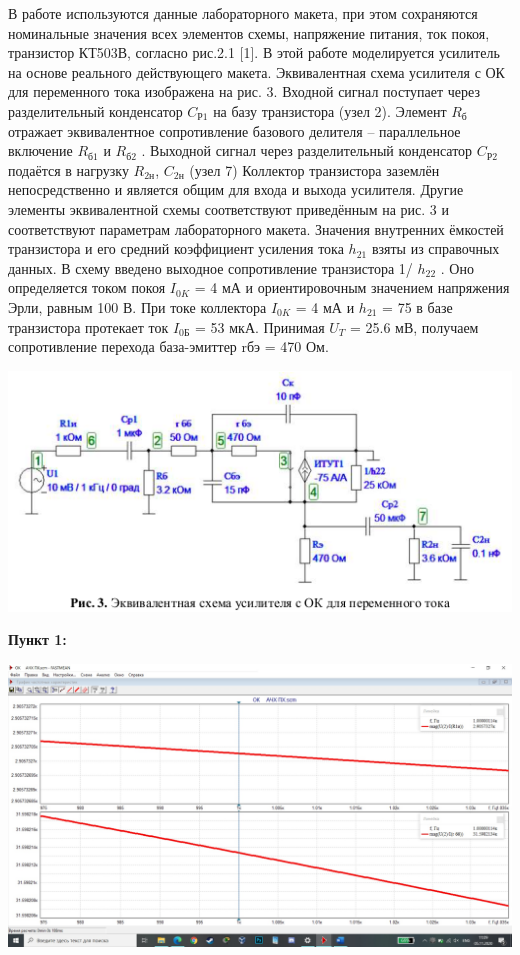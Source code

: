 \documentclass[a4paper,14pt]{extarticle}
\begin{document}
    В работе используются данные лабораторного макета, при этом
    сохраняются номинальные значения всех элементов схемы, напряжение
    питания, ток покоя, транзистор КТ503В, согласно рис.2.1 [1]. В этой работе
    моделируется усилитель на основе реального действующего макета.
    Эквивалентная схема усилителя с ОК для переменного тока изображена на
    рис. 3. Входной сигнал поступает через разделительный конденсатор $C_{\text{Р1}}$ на
    базу транзистора (узел 2). Элемент $R_{\text{б}}$ отражает эквивалентное сопротивление
    базового делителя – параллельное включение $R_{\text{б1}}$ и $R_{\text{б2}}$ . Выходной сигнал через
    разделительный конденсатор $C_{Р2}$ подаётся в нагрузку $R_{\text{2н}}$, $C_{\text{2н}}$ (узел 7)
    Коллектор транзистора заземлён непосредственно и является общим для входа
    и выхода усилителя. Другие элементы эквивалентной схемы соответствуют
    приведённым на рис. 3 и соответствуют параметрам лабораторного макета.
    Значения внутренних ёмкостей транзистора и его средний коэффициент
    усиления тока $h_{21}$ взяты из справочных данных. В схему введено выходное
    сопротивление транзистора 1/ $h_{22}$ . Оно определяется током покоя $I_{0K}$ = 4 мА и
    ориентировочным значением напряжения Эрли, равным 100 В. При токе
    коллектора $I_{0K}$ = 4 мА и $h_{21}$ = 75 в базе транзистора протекает ток $I_{\text{0Б}}$ = 53 мкА.
    Принимая $U_T$ = 25.6 мВ, получаем сопротивление перехода база-эмиттер
    rбэ = 470 Ом.

    \begin{center}
        \includegraphics[scale=0.9]{0.3.png}
    \end{center}

    \newpage
    \textbf{Пункт 1:}
    \begin{center}
        \includegraphics[scale=0.25]{1.jpg}
    \end{center}
\end{document}
